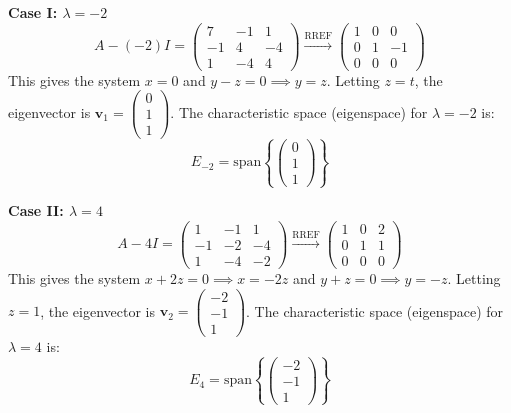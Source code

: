 \documentclass[12pt,a3paper]{article}
\begin{document}
\begin{tcolorbox}
\vspace{0.2cm}
\textbf{Case I: $\lambda = -2$}
\[
A - (-2)I = \begin{pmatrix} 7 & -1 & 1 \\ -1 & 4 & -4 \\ 1 & -4 & 4 \end{pmatrix} \xrightarrow{\text{RREF}} \begin{pmatrix} 1 & 0 & 0 \\ 0 & 1 & -1 \\ 0 & 0 & 0 \end{pmatrix}
\]
This gives the system $x = 0$ and $y - z = 0 \implies y = z$. 
Letting $z = t$, the eigenvector is $\mathbf{v}_1 = \begin{pmatrix} 0 \\ 1 \\ 1 \end{pmatrix}$. 
The characteristic space (eigenspace) for $\lambda = -2$ is:
\[
E_{-2} = \text{span} \left\{ \begin{pmatrix} 0 \\ 1 \\ 1 \end{pmatrix} \right\}
\]

\vspace{0.2cm}
\textbf{Case II: $\lambda = 4$}
\[
A - 4I = \begin{pmatrix} 1 & -1 & 1 \\ -1 & -2 & -4 \\ 1 & -4 & -2 \end{pmatrix} \xrightarrow{\text{RREF}} \begin{pmatrix} 1 & 0 & 2 \\ 0 & 1 & 1 \\ 0 & 0 & 0 \end{pmatrix}
\]
This gives the system $x + 2z = 0 \implies x = -2z$ and $y + z = 0 \implies y = -z$. 
Letting $z = 1$, the eigenvector is $\mathbf{v}_2 = \begin{pmatrix} -2 \\ -1 \\ 1 \end{pmatrix}$.
The characteristic space (eigenspace) for $\lambda = 4$ is:
\[
E_{4} = \text{span} \left\{ \begin{pmatrix} -2 \\ -1 \\ 1 \end{pmatrix} \right\}
\]


\end{tcolorbox}
\end{document}
